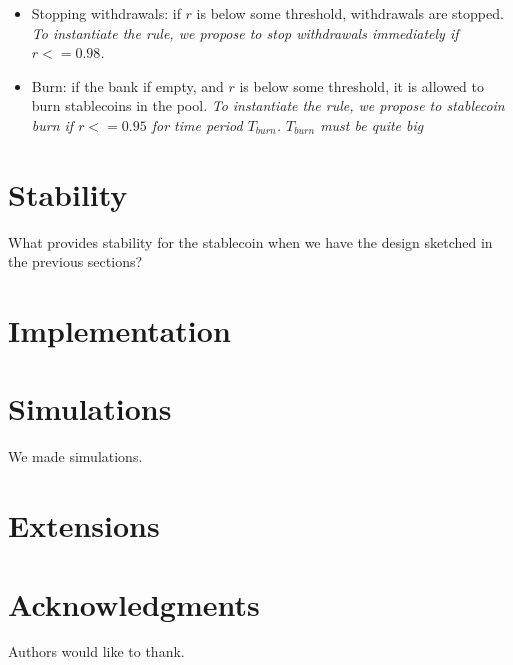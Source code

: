 \documentclass{article}   %
\newcommand{\authnote}[2]{\marginpar{\parbox{\marginparwidth}{\tiny %
  \textsf{#1 {\textcolor{blue}{notes: #2}}}}}%
  \textcolor{blue}{\textbf{\dag}}}
\newcommand{\authnote}[2]{
  \textsf{#1 \textcolor{blue}{: #2}}}
\newcommand{\authnote}[2]{}
\newcommand{\knote}[1]{{\authnote{\textcolor{green}{Alex notes}}{#1}}}
\newcommand{\sct}{stablecoin}
\begin{document}
\begin{itemize}
   \item{Stopping withdrawals: } if $r$ is below some threshold, withdrawals are stopped.  
   \em{To instantiate the rule, we propose to stop withdrawals immediately if $r <= 0.98$.}
   \item{Burn: } if the bank if empty, and $r$ is below some threshold, it is allowed to burn \sct{}s in the pool. 
   \em{To instantiate the rule, we propose to \sct{} burn if $r <= 0.95$ for time period $T_{burn}$. $T_{burn}$ must be quite big}
\end{itemize} 

\section{Stability}

What provides stability for the stablecoin when we have the design sketched in the previous sections? 
 
\knote{finish the section}

\section{Implementation}

\knote{put contracts here}

\section{Simulations}
We made simulations. \knote{finish}

\section{Extensions}


%
%
%
%
%
%
%
%
%

\section*{Acknowledgments}

Authors would like to thank.





%
\end{document}
